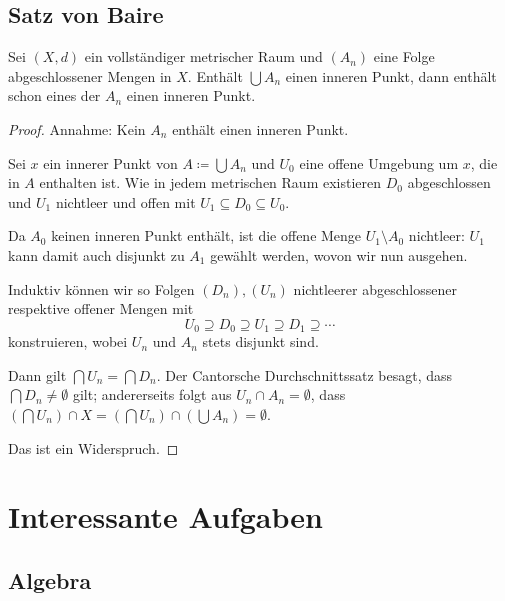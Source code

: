 \documentclass[ngerman, 11pt, a4paper, twoside, abstracton]{scrbook}
\begin{document}
\section{Satz von Baire}

\begin{theorem}
  Sei $\left( X, d \right)$ ein vollständiger metrischer Raum und $\left( A_n \right)$ eine Folge abgeschlossener Mengen in $X$. Enthält $\bigcup A_n$ einen inneren Punkt, dann enthält schon eines der $A_n$ einen inneren Punkt.
\end{theorem}
\begin{proof}
  Annahme: Kein $A_n$ enthält einen inneren Punkt.

  Sei $x$ ein innerer Punkt von $A\coloneqq\bigcup A_n$ und $U_0$ eine offene Umgebung um $x$, die in $A$ enthalten ist. Wie in jedem metrischen Raum existieren $D_0$ abgeschlossen und $U_1$ nichtleer und offen mit $U_1 \subseteq D_0 \subseteq U_0$.
  
  Da $A_0$ keinen inneren Punkt enthält, ist die offene Menge $U_1 \setminus A_0$ nichtleer: $U_1$ kann damit auch disjunkt zu $A_1$ gewählt werden, wovon wir nun ausgehen.

  Induktiv können wir so Folgen $\left( D_n \right), \left( U_n \right)$ nichtleerer abgeschlossener respektive offener Mengen mit
  \[
    U_0 \supseteq D_0 \supseteq U_1 \supseteq D_1 \supseteq \cdots
  \]
  konstruieren, wobei $U_n$ und $A_n$ stets disjunkt sind.

  Dann gilt $\bigcap U_n = \bigcap D_n$. Der Cantorsche Durchschnittssatz besagt, dass $\bigcap D_n \ne \emptyset$ gilt; andererseits folgt aus $U_n \cap A_n = \emptyset$, dass $\left( \bigcap U_n \right) \cap X = \left( \bigcap U_n \right) \cap \left( \bigcup A_n \right) = \emptyset$.

  Das ist ein Widerspruch.
\end{proof}
\appendix

\chapter{Interessante Aufgaben}

\section{Algebra}
\end{document}
